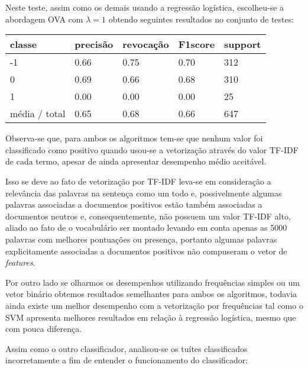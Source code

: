 Neste teste, assim como os demais usando a regressão logística, escolheu-se a abordagem OVA com
$\lambda = 1$ obtendo seguintes resultados no conjunto de testes:

\begin{table}[H]
	\centering
		\begin{tabular}{l | l | l | l | l}
		\hline
		classe  	&	precisão  &  revocação &  F1\-score &  support \\
		\hline
		 -1    &   0.66   &   0.75   &   0.70   &    312 \\
		 \hline
          0    &   0.69   &   0.66   &   0.68   &    310 \\
          \hline
          1    &   0.00   &   0.00   &   0.00    &    25 \\
		\hline
		média / total   &    0.65   &   0.68   &   0.66   &    647 \\
		\hline
	\end{tabular}
\end{table}

Observa-se que, para ambos os algoritmos tem-se que nenhum valor foi classificado como
positivo quando usou-se a vetorização através do valor TF-IDF de cada termo, apesar de ainda
apresentar desempenho médio aceitável. 

Isso se deve ao fato de vetorização por TF-IDF
leva-se em consideração a relevância das palavras na sentença como um todo e, possivelmente
algumas palavras associadas a documentos positivos estão também associadas
a documentos neutros e, consequentemente, não possuem um valor TF-IDF alto, aliado ao fato de o vocabulário
ser montado levando em conta apenas as 5000 palavras com melhores pontuações ou presença, portanto
algumas palavras explicitamente associadas a documentos positivos não compuseram o vetor de
\textit{features}.

Por outro lado se olharmos os desempenhos utilizando frequências simples ou um vetor binário
obtemos resultados semelhantes para ambos os algoritmos, todavia ainda existe um melhor desempenho
com a vetorização por frequências tal como o SVM apresenta melhores resultados em relação à regressão
logística, mesmo que com pouca diferença.

Assim como o outro classificador, analisou-se os tuítes classificados incorretamente a fim de
entender o funcionamento do classificador:

